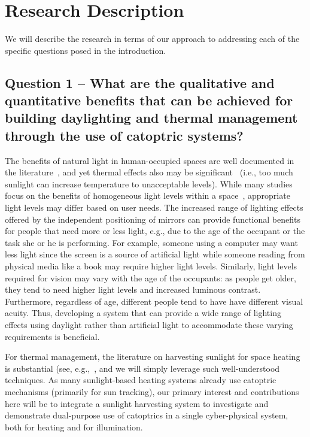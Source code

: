 \section{Research Description}
\label{sec:research}

We will describe the research in terms of our approach to addressing each
of the specific questions posed in the introduction.

\subsection{Question 1 -- What are the qualitative and quantitative benefits
that can be achieved for building daylighting and thermal management
through the use of catoptric systems?}

The benefits of natural light in human-occupied spaces are well documented in the literature~\cite{hhm15,Leslie03,ll01,pce00}, and yet thermal effects also may be significant~\cite{bmbc13} (i.e., too much sunlight can increase temperature to unacceptable levels).
While many studies focus on the benefits of homogeneous light levels within a space~\cite{azaise13,bwkk15,gb16}, appropriate light levels may differ based on user needs.
The increased range of lighting effects offered by the independent positioning of mirrors
can provide functional benefits for people that need more or less
light, e.g., due to the age of the occupant or the task she or he is performing. For 
example, someone using a computer may want less light since the screen is a source of
artificial light while someone reading from physical media like
a book may require higher light levels. Similarly, light levels required for
vision may vary with the age of the occupants: as people get older, they tend to need 
higher light levels and increased luminous contrast. Furthermore, regardless of age,
different people tend to have have different visual acuity. Thus, developing a system 
that can provide a wide range of lighting effects using daylight rather than artificial light to accommodate these varying requirements is beneficial.

For thermal management, the literature on harvesting sunlight for
space heating is substantial (see,
e.g.,~\cite{deW75,Hunt79,kbd76,Lunde80,smf08,wo06}, and we will simply
leverage such well-understood techniques. As many sunlight-based
heating systems already use catoptric mechanisms (primarily for sun
tracking), our primary interest and contributions here will be to
integrate a sunlight harvesting system to investigate and demonstrate
dual-purpose use of catoptrics in a single cyber-physical system, both
for heating and for illumination.

